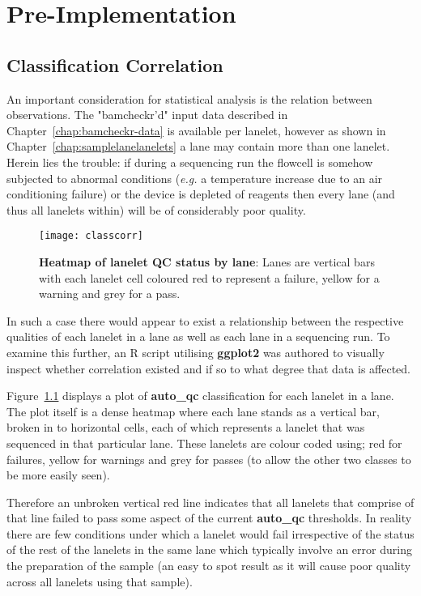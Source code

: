 \chapter{Pre-Implementation}
\section{Classification Correlation}

An important consideration for statistical analysis is the relation between
observations. The "bamcheckr'd" input data described in
Chapter~\ref{chap:bamcheckr-data} is available per lanelet, however as shown in
Chapter~\ref{chap:samplelanelanelets} a lane may contain more than one lanelet.
Herein lies the trouble: if during a sequencing run the flowcell is somehow
subjected to abnormal conditions (\textit{e.g.} a temperature increase due to an air
conditioning failure) or the device is depleted of reagents then every lane (and
thus all lanelets within) will be of considerably poor quality.

\begin{figure}[htbp!]
    \centering
    \texttt{[image: classcorr]}
    \caption[ClassCorr]{\textbf{Heatmap of lanelet QC status by lane}: Lanes are
    vertical bars with each lanelet cell coloured red to represent a failure,
yellow for a warning and grey for a pass.}
    \label{fig:classcorr}
\end{figure}

In such a case there would appear to exist a relationship between the respective
qualities of each lanelet in a lane as well as each lane in a sequencing run. To
examine this further, an R script utilising \textbf{ggplot2} was authored to
visually inspect whether correlation existed and if so to what degree that data
is affected.

Figure~\ref{fig:classcorr} displays a plot of \textbf{auto\_qc} classification
for each lanelet in a lane. The plot itself is a dense heatmap
where each lane stands as a vertical bar, broken in to horizontal cells, each
of which represents a lanelet that was sequenced in that particular lane. These
lanelets are colour coded using; red for failures, yellow for warnings and grey
for passes (to allow the other two classes to be more easily seen).

Therefore an unbroken vertical red line indicates that all lanelets that
comprise of that line failed to pass some aspect of the current
\textbf{auto\_qc} thresholds. In reality there are few conditions under which
a lanelet would fail irrespective of the status of the rest of the lanelets in
the same lane which typically involve an error during the preparation of the
sample (an easy to spot result as it will cause poor quality across all lanelets
using that sample).

